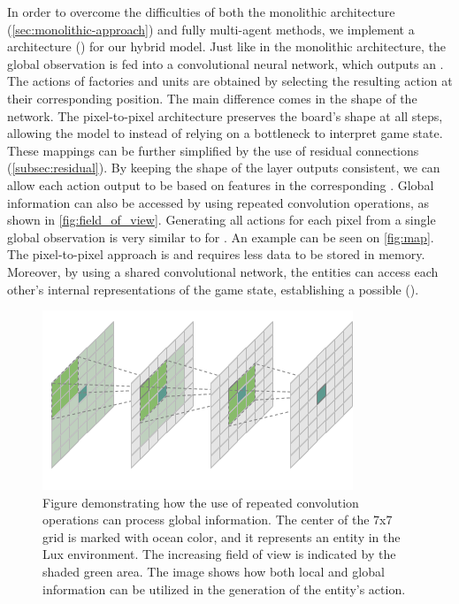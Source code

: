 \noindent In order to overcome the difficulties of both the monolithic architecture (\autoref{sec:monolithic-approach}) and fully multi-agent methods, we implement a  architecture \label{par:pixel-to-pixel} (\cite{chen2023emergent}) for our hybrid  model. Just like in the monolithic architecture, the global observation is fed into a convolutional neural network, which outputs an . The actions of factories and units are obtained by selecting the resulting action at their corresponding position. The main difference comes in the shape of the network. The pixel-to-pixel architecture preserves the board's shape at all steps, allowing the model to  instead of relying on a bottleneck to interpret game state. These mappings can be further simplified by the use of residual connections (\autoref{subsec:residual}). By keeping the shape of the layer outputs consistent, we can allow each action output to be based on features in the corresponding . Global information can also be accessed by using repeated convolution operations, as shown in \autoref{fig:field_of_view}. Generating all actions for each pixel from a single global observation is very similar to  for . An example can be seen on \autoref{fig:map}. The pixel-to-pixel approach is  and requires less data to be stored in memory. Moreover, by using a shared convolutional network, the entities can access each other's internal representations of the game state, establishing a possible  (\cite{pmlr-v97-han19a}).

\begin{figure}[htbp]
    \centering
    \includegraphics[width=0.7\linewidth]{images/methods_hybrid/field_of_view.png}
    \captionsetup{justification=justified, singlelinecheck=false, width=1\linewidth, labelfont=bf} 
    \caption[]{Figure demonstrating how the use of repeated convolution operations can process global information. The center of the 7x7 grid is marked with ocean color, and it represents an entity in the Lux environment. The increasing field of view is indicated by the shaded green area. The image shows how both local and global information can be utilized in the generation of the entity's action.}
    \label{fig:field_of_view}
\end{figure}


